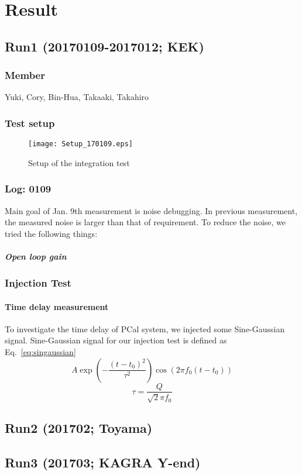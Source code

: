 
\chapter{Result} %

\label{Chapter2} %


\section{Run1 (20170109-2017012; KEK)}
\subsection{Member}
Yuki, Cory, Bin-Hua, Takaaki, Takahiro
\subsection{Test setup}
\begin{figure}
	\begin{center}
                 \texttt{[image: Setup\_170109.eps]}
                 \caption{Setup of the integration test} 
                 \label{fig:Setup} 
	\end{center}
\end{figure}
\subsection{Log: 01\/09}
Main goal of Jan. 9th measurement is noise debugging.
In previous measurement, the measured noise is larger than that of requirement.
To reduce the noise, we tried the following things:
\paragraph{Open loop gain}


\subsection{Injection Test}
\subsubsection{Time delay measurement}

To investigate the time delay of PCal system, we injected some Sine-Gaussian signal.
 Sine-Gaussian signal for our injection test is defined as Eq.~\ref{eq:singaussian}
\begin{equation}
\label{eq:singaussian}
    A \exp\left(-\frac{(t-t_0)^2}{\tau^2}\right) \cos ( 2 \pi f_0 (t-t_0))
\end{equation}
\begin{equation*}
   \tau = \frac{Q}{ \sqrt{2} \pi f_0}
\end{equation*}


\section{Run2 (201702; Toyama)}

\section{Run3 (201703; KAGRA Y-end)}

